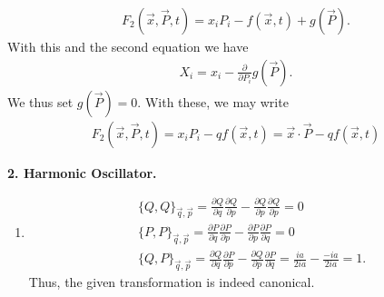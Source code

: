 \documentclass{article}
\theoremstyle{definition}
\newcommand{\p}{\partial}
\newcommand{\f}[2]{\frac{#1}{#2}}
\begin{document}
\begin{enumerate}[label=(\alph*)]
	\begin{align*}
	F_2(\vec{x},\vec{P},t) = x_i P_i - f(\vec{x},t) + g(\vec{P}).
	\end{align*}
	With this and the second equation we have
	\begin{align*}
	X_i = x_i - \f{\p}{\p P_i}g(\vec{P}).
	\end{align*}
	We thus set $g(\vec{P}) = 0$. With these, we may write
	\begin{align*}
	\boxed{F_2(\vec{x}, \vec{P},t) = x_i P_i - qf(\vec{x},t) = \vec{x}\cdot \vec{P} - q f(\vec{x},t)}
	\end{align*} 
\end{enumerate}


\noindent \textbf{2. Harmonic Oscillator.} 


\begin{enumerate}[label=(\alph*)]
	\item
	\begin{align*}
	&\{ Q, Q \}_{\vec{q},\vec{p}} = \f{\p Q}{\p q} \f{\p Q}{\p p} - \f{\p Q}{\p p} \f{\p Q}{\p p}= 0\\
	&\{ P, P \}_{\vec{q},\vec{p}} = \f{\p P}{\p q} \f{\p P}{\p p} - \f{\p P}{\p p} \f{\p P}{\p q} = 0\\
	&\{ Q, P \}_{\vec{q},\vec{p}} = \f{\p Q}{\p q} \f{\p P}{\p p} - \f{\p Q}{\p p} \f{\p P}{\p q} = \f{ia}{2ia} - \f{-ia}{2ia} = 1.
	\end{align*}
	Thus, the given transformation is indeed canonical. 
	

\end{enumerate}
\end{document}
